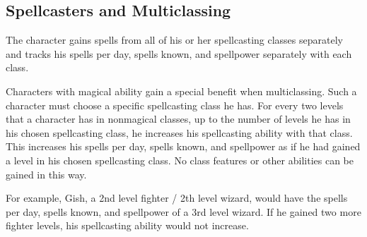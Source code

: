 \subsection{Spellcasters and Multiclassing}\label{Spellcasters and Multiclassing}
The character gains spells from all of his or her spellcasting classes separately and tracks his spells per day, spells known, and spellpower separately with each class.

Characters with magical ability gain a special benefit when multiclassing.
Such a character must choose a specific spellcasting class he has.
For every two levels that a character has in nonmagical classes, up to the number of levels he has in his chosen spellcasting class, he increases his spellcasting ability with that class.
This increases his spells per day, spells known, and spellpower as if he had gained a level in his chosen spellcasting class.
No class features or other abilities can be gained in this way.


For example, Gish, a 2nd level fighter / 2th level wizard, would have the spells per day, spells known, and spellpower of a 3rd level wizard.
If he gained two more fighter levels, his spellcasting ability would not increase.
